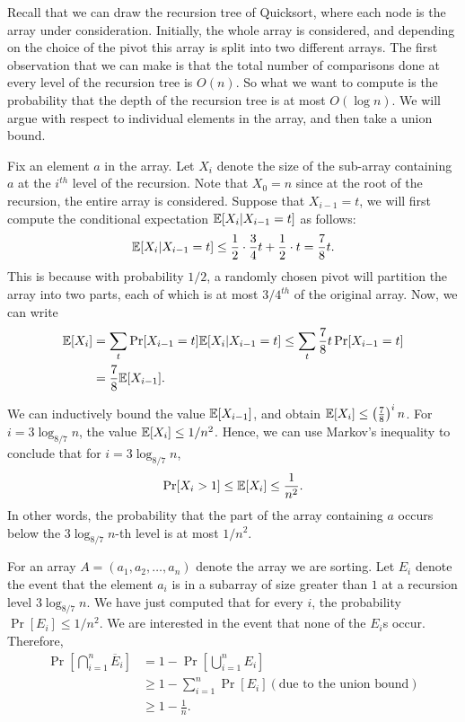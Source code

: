 Recall that we can draw the recursion tree of Quicksort, where each node is the array under consideration. Initially, the whole array is considered, and depending on the choice of the pivot this array is split into two different arrays. The first observation that we can make is that the total number of comparisons done at every level of the recursion tree is $O(n)$. So what we want to compute is the probability that the depth of the recursion tree is at most $O(\log n)$. We will argue with respect to individual elements in the array, and then take a union bound. 

Fix an element $a$ in the array. Let $X_i$ denote the size of the sub-array containing $a$ at the $i^{th}$ level of the recursion. Note that $X_0 = n$ since at the root of the recursion, the entire array is considered. Suppose that $X_{i-1}=t$, we will first compute the conditional expectation $\mathbb{E}[X_i | X_{i-1}=t]$ as follows:
\begin{align*}
	\mathbb{E}[X_i | X_{i-1} = t] \leq \frac{1}{2} \cdot \frac{3}{4}t + \frac{1}{2}\cdot t = \frac{7}{8}t.
\end{align*}
This is because with probability $1/2$, a randomly chosen pivot will partition the array into two parts, each of which is at most $3/4^{th}$ of the original array. Now, we can write
\begin{align*}
	\mathbb{E}[X_i] &= \sum_{t} \Pr[X_{i-1}=t]\mathbb{E}[X_i|X_{i-1}=t] \leq \sum_{t} \frac{7}{8}t\Pr[X_{i-1}=t]\\
	&= \frac{7}{8}\mathbb{E}[X_{i-1}].
\end{align*}

We can inductively bound the value $\mathbb{E}[X_{i-1}]$, and obtain $\mathbb{E}[X_i] \leq \left(\frac{7}{8}\right)^in$. For $i=3\log_{8/7} n$, the value $\mathbb{E}[X_i] \leq 1/n^2$. Hence, we can use Markov's inequality to conclude that for $i = 3\log_{8/7}n$,
\begin{align*}
	\Pr[X_i > 1] \leq \mathbb{E}[X_i] \leq \frac{1}{n^2}.
\end{align*}
In other words, the probability that the part of the array containing $a$ occurs below the $3\log_{8/7}n$-th level is at most $1/n^2$. 

For an array $A = (a_1, a_2, \ldots, a_n)$ denote the array we are sorting. Let $E_i$ denote the event that the element $a_i$ is in a subarray of size greater than $1$ at a recursion level $3\log_{8/7} n$. We have just computed that for every $i$, the probability $\Pr[E_i] \leq 1/n^2$. We are interested in the event that none of the $E_i$s occur. Therefore,
\begin{align*}
	\Pr\left[ \bigcap_{i=1}^n \overline{E}_i \right] &= 1 - \Pr\left[ \bigcup_{i=1}^n E_i \right]\\
	&\geq 1 - \sum_{i=1}^n \Pr[E_i] (\text{due to the union bound})\\
	&\geq 1 - \frac{1}{n}.
\end{align*}

